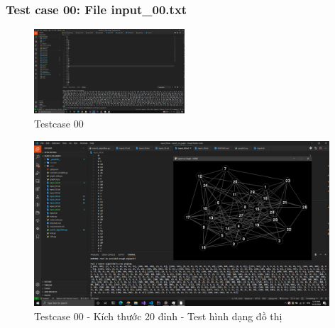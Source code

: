 \documentclass{article}
\begin{document}
\subsubsection{Test case 00: File input\_00.txt}
\begin{figure}[H]
\centering
\includegraphics[width=0.5\textwidth]{Test_Case_0.png}
\caption{Testcase 00}
\end{figure}
\begin{figure}[H]
\centering
\includegraphics[width=0.98\textwidth]{Test_Case_0_Content.png}
\caption{Testcase 00 - Kích thước 20 đỉnh - Test hình dạng đồ thị}
\end{figure}
\end{document}
